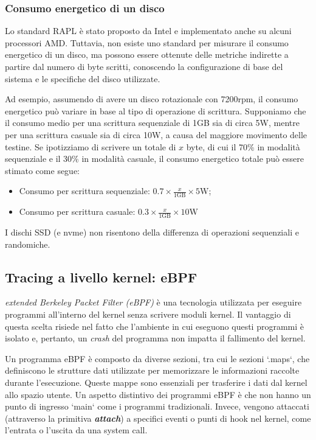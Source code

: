 \documentclass{article}
\begin{document}
\subsubsection{Consumo energetico di un disco}
Lo standard RAPL è stato proposto da Intel e implementato anche su alcuni processori AMD. Tuttavia, non esiste uno standard per misurare il consumo energetico di un disco, ma possono essere ottenute delle metriche indirette a partire dal numero di byte scritti, conoscendo la configurazione di base del sistema e le specifiche del disco utilizzate.

Ad esempio, assumendo di avere un disco rotazionale con 7200rpm, il consumo energetico può variare in base al tipo di operazione di scrittura. Supponiamo che il consumo medio per una scrittura sequenziale di 1GB sia di circa 5W, mentre per una scrittura casuale sia di circa 10W, a causa del maggiore movimento delle testine. Se ipotizziamo di scrivere un totale di \(x\) byte, di cui il 70\% in modalità sequenziale e il 30\% in modalità casuale, il consumo energetico totale può essere stimato come segue:

\begin{itemize}
  \item Consumo per scrittura sequenziale: \(0.7 \times \frac{x}{1 \text{GB}} \times 5 \text{W}\);
  \item Consumo per scrittura casuale: \(0.3 \times \frac{x}{1 \text{GB}} \times 10 \text{W}\)
\end{itemize}

I dischi SSD (e nvme) non risentono della differenza di operazioni sequenziali e randomiche.

\subsection{Tracing a livello kernel: eBPF}
\emph{extended Berkeley Packet Filter (eBPF)}\cite{ebpf-docs} è una tecnologia utilizzata per eseguire programmi all'interno del kernel senza scrivere moduli kernel. Il vantaggio di questa scelta risiede nel fatto che l'ambiente in cui eseguono questi programmi è isolato e, pertanto, un \textit{crash} del programma non impatta il fallimento del kernel.

Un programma eBPF è composto da diverse sezioni, tra cui le sezioni `.maps`, che definiscono le strutture dati utilizzate per memorizzare le informazioni raccolte durante l'esecuzione. Queste mappe sono essenziali per trasferire i dati dal kernel allo spazio utente. Un aspetto distintivo dei programmi eBPF è che non hanno un punto di ingresso `main` come i programmi tradizionali. Invece, vengono attaccati (attraverso la primitiva \textbf{\textit{attach}}) a specifici eventi o punti di hook nel kernel, come l'entrata o l'uscita da una system call.
\end{document}

